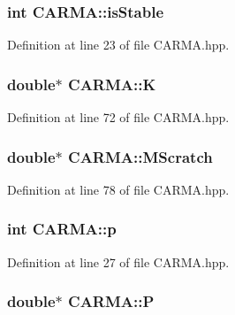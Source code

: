 \hypertarget{class_c_a_r_m_a_a5234c38768e071f37c8a6bdfaf06f499}{
\subsubsection[{is\-Stable}]{\setlength{\rightskip}{0pt plus 5cm}int C\-A\-R\-M\-A\-::is\-Stable}}\label{class_c_a_r_m_a_a5234c38768e071f37c8a6bdfaf06f499}


Definition at line 23 of file C\-A\-R\-M\-A.\-hpp.

\hypertarget{class_c_a_r_m_a_a01b4c677af0ad6e7981851efe9fd3563}{
\subsubsection[{K}]{\setlength{\rightskip}{0pt plus 5cm}double$\ast$ C\-A\-R\-M\-A\-::\-K}}\label{class_c_a_r_m_a_a01b4c677af0ad6e7981851efe9fd3563}


Definition at line 72 of file C\-A\-R\-M\-A.\-hpp.

\hypertarget{class_c_a_r_m_a_a17050731a928b7e2a024fd8c1b5acd6d}{
\subsubsection[{M\-Scratch}]{\setlength{\rightskip}{0pt plus 5cm}double$\ast$ C\-A\-R\-M\-A\-::\-M\-Scratch}}\label{class_c_a_r_m_a_a17050731a928b7e2a024fd8c1b5acd6d}


Definition at line 78 of file C\-A\-R\-M\-A.\-hpp.

\hypertarget{class_c_a_r_m_a_a69668ba1aef7197cc54078cd0ae94ce2}{
\subsubsection[{p}]{\setlength{\rightskip}{0pt plus 5cm}int C\-A\-R\-M\-A\-::p}}\label{class_c_a_r_m_a_a69668ba1aef7197cc54078cd0ae94ce2}


Definition at line 27 of file C\-A\-R\-M\-A.\-hpp.

\hypertarget{class_c_a_r_m_a_ab6923d0ca4591a595c997549a0487cb3}{
\subsubsection[{P}]{\setlength{\rightskip}{0pt plus 5cm}double$\ast$ C\-A\-R\-M\-A\-::\-P}}\label{class_c_a_r_m_a_ab6923d0ca4591a595c997549a0487cb3}


